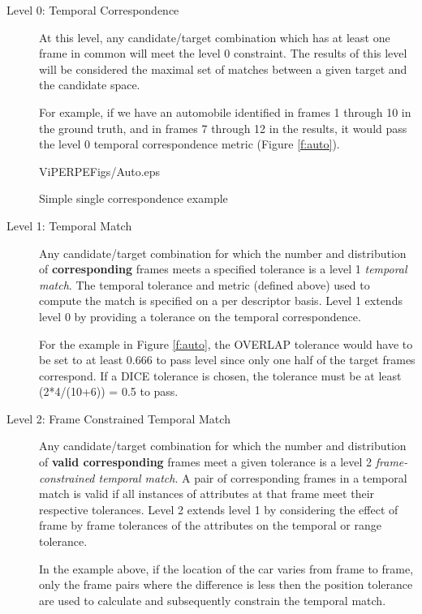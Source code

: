 \begin{description}

\item [Level 0: Temporal Correspondence]

At this level, any candidate/target combination which has at least one
frame in common will meet the level 0 constraint.  The results of this
level will be considered the maximal set of matches between a given
target and the candidate space.

For example, if we have an automobile identified in frames 1 through
10 in the ground truth, and in frames 7 through 12 in the results, it
would pass the level 0 temporal correspondence metric (Figure \ref{f:auto}).

\begin{putfig}{ViPERPEFigs/Auto.eps}
\caption{Simple single correspondence example}
\label{f:auto}
\end{putfig}


\item [Level 1: Temporal Match] \emptyline 
Any candidate/target combination for which the number and
distribution of {\bf corresponding} frames meets a specified tolerance
is a level 1 {\em temporal match}. The temporal tolerance  and metric (defined above) used to compute the match is specified
on a per descriptor basis.
Level 1 extends level 0 by providing a tolerance on the temporal
correspondence.  

For the example in Figure \ref{f:auto}, the OVERLAP tolerance would have to be set to
at least 0.666 to pass level since only one half of the target frames
correspond.  If a DICE tolerance is chosen, the tolerance must be
at least (2*4/(10+6)) = 0.5  to pass.

\item [Level 2: Frame Constrained Temporal Match] \emptyline 
Any candidate/target combination for which the number and distribution of
{\bf valid corresponding} frames meet a given tolerance is a level 2 {\em
frame-constrained temporal match}.  A pair of corresponding frames in a
temporal match is valid if all instances of attributes at that frame
meet their respective tolerances.  Level 2 extends level 1 by
considering the effect of frame by frame tolerances of the attributes
on the temporal or range tolerance.

In the example above, if the location of the car varies from frame to
frame, only the frame pairs where the difference is less then the
position tolerance are used to calculate and subsequently constrain
the temporal match.
        

\end{description}
